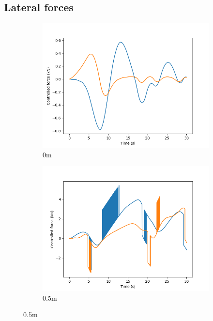 \documentclass[class=article, crop=false]{standalone}
\begin{document}
\subsection{Lateral forces}
\begin{figure}
    \centering
    \begin{subfigure}[b]{0.48\textwidth}
        \centering
        \includegraphics{scenario1/rov-0m/0.0m/usv_forces}
        \caption{0m}
        \label{}
    \end{subfigure}
    \hfill
    \begin{subfigure}[b]{0.48\textwidth}
        \centering
        \includegraphics{scenario1/rov-0m/0.5m/usv_forces}
        \caption{0.5m}
        \label{}
    \end{subfigure}

\end{figure}
\end{document}
